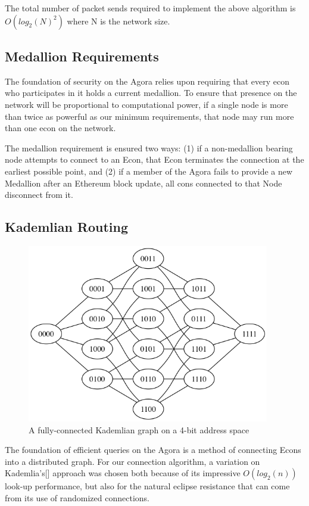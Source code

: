 \documentclass{article}
\begin{document}
The total number of packet sends required to implement the above algorithm is $O(log_2(N)^2)$ where N is the network size.

\subsection{Medallion Requirements}

The foundation of security on the Agora relies upon requiring that every econ who participates in it holds a current medallion. To ensure that presence on the network will be proportional to computational power, if a single node is more than twice as powerful as our minimum requirements, that node may run more than one econ on the network.

The medallion requirement is ensured two ways: (1) if a non-medallion bearing node attempts to connect to an Econ, that Econ terminates the connection at the earliest possible point, and (2) if a member of the Agora fails to provide a new Medallion after an Ethereum block update, all cons connected to that Node disconnect from it.

\subsection{Kademlian Routing}

\begin{figure}[htbp]
  \centering
  \includegraphics[width = 300pt]{xorSpace}
  \caption{A fully-connected Kademlian graph on a 4-bit address space}
\end{figure}

The foundation of efficient queries on the Agora is a method of connecting Econs into a distributed graph. For our connection algorithm, a variation on Kademlia's[] approach was chosen both because of its impressive $O(log_2(n))$ look-up performance, but also for the natural eclipse resistance that can come from its use of randomized connections.
\end{document}
